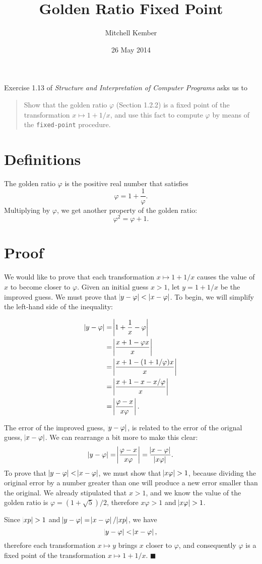 \documentclass{article}
\title{Golden Ratio Fixed Point}
\author{Mitchell Kember}
\date{26 May 2014}
\newcommand*{\p}{\ensuremath{\varphi}}
\begin{document}
\maketitle

\noindent Exercise 1.13 of \emph{Structure and Interpretation of Computer Programs} asks us to
\begin{quote}
Show that the golden ratio \p{} (Section 1.2.2) is a fixed point of the transformation \(x\mapsto 1+1/x\), and use this fact to compute \p{} by means of the \texttt{fixed-point} procedure.
\end{quote}

\section*{Definitions}
The golden ratio \p{} is the positive real number that satisfies
\[\p = 1 + \frac{1}{\p}.\]
Multiplying by \p{}, we get another property of the golden ratio:
\[\p^2 = \p + 1.\]

\section*{Proof}
We would like to prove that each transformation \(x\mapsto 1+1/x\) causes the value of \(x\) to become closer to \p{}. Given an initial guess \(x>1\), let \(y=1+1/x\) be the improved guess. We must prove that \(\abs{y-\p} < \,\abs{x-\p}\). To begin, we will simplify the left-hand side of the inequality:

\begin{align*}
\abs{y-\p}
&= \abs{1+\frac1x-\p}\\
&= \abs{\frac{x+1-\p x}{x}}\\
&= \abs{\frac{x+1-(1+1/\p)x}{x}}\\
&= \abs{\frac{x+1-x-x/\p}{x}}\\
&= \abs{\frac{\p-x}{x\p}}.
\end{align*}

The error of the improved guess, \(\abs{y-\p}\), is related to the error of the orignal guess, \(\abs{x-\p}\). We can rearrange a bit more to make this clear:
\[\abs{y-\p} = \abs{\frac{\p-x}{x\p}} = \frac{\abs{x-\p}}{\abs{x\p}}.\]
To prove that \(\abs{y-\p}<\abs{x-\p}\), we must show that \(\abs{x\p}>1\), because dividing the original error by a number greater than one will produce a new error smaller than the original. We already stipulated that \(x>1\), and we know the value of the golden ratio is \(\p=(1+\sqrt{5})/2\), therefore \(x\p>1\) and \(\abs{x\p}>1\).

Since \(\abs{xp}>1\) and \(\abs{y-\p} = \abs{x-\p}/\abs{xp}\), we have
\[\abs{y-\p}<\abs{x-\p},\]
therefore each transformation \(x\mapsto y\) brings \(x\) closer to \p{}, and consequently \p{} is a fixed point of the transformation \(x\mapsto 1+1/x\). \(\blacksquare\)
\end{document}
